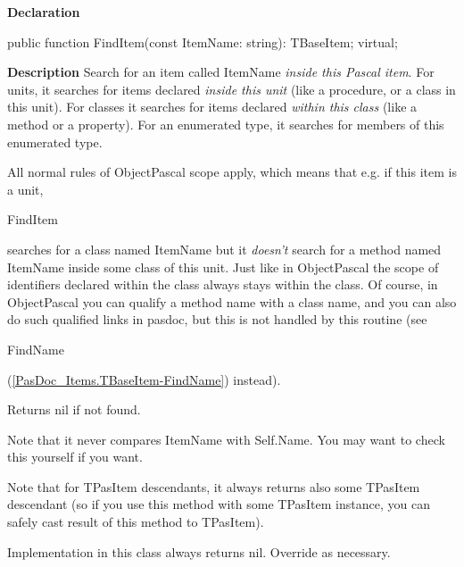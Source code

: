 \documentclass{report}
\newif\ifpdf
\begin{document}
\label{PasDoc_Items.TBaseItem-FindItem}
\begin{list}{}{
\setlength{\itemindent}{0cm}
\setlength{\listparindent}{0cm}
\setlength{\leftmargin}{\evensidemargin}
\addtolength{\leftmargin}{\tmplength}
\settowidth{\labelsep}{X}
\addtolength{\leftmargin}{\labelsep}
\setlength{\labelwidth}{\tmplength}
}
\item[\textbf{Declaration}\hfill]
\ifpdf
\begin{flushleft}
\fi
\begin{ttfamily}
public function FindItem(const ItemName: string): TBaseItem; virtual;\end{ttfamily}

\ifpdf
\end{flushleft}
\fi

\par
\item[\textbf{Description}]
Search for an item called ItemName \textit{inside this Pascal item}. For units, it searches for items declared \textit{inside this unit} (like a procedure, or a class in this unit). For classes it searches for items declared \textit{within this class} (like a method or a property). For an enumerated type, it searches for members of this enumerated type.

All normal rules of ObjectPascal scope apply, which means that e.g. if this item is a unit, \begin{ttfamily}FindItem\end{ttfamily} searches for a class named ItemName but it \textit{doesn't} search for a method named ItemName inside some class of this unit. Just like in ObjectPascal the scope of identifiers declared within the class always stays within the class. Of course, in ObjectPascal you can qualify a method name with a class name, and you can also do such qualified links in pasdoc, but this is not handled by this routine (see \begin{ttfamily}FindName\end{ttfamily}(\ref{PasDoc_Items.TBaseItem-FindName}) instead).

Returns nil if not found.

Note that it never compares ItemName with Self.Name. You may want to check this yourself if you want.

Note that for TPasItem descendants, it always returns also some TPasItem descendant (so if you use this method with some TPasItem instance, you can safely cast result of this method to TPasItem).

Implementation in this class always returns nil. Override as necessary.

\end{list}
\end{document}
